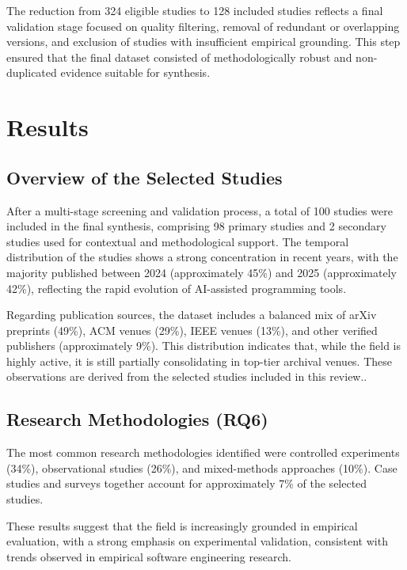 \documentclass[conference]{IEEEtran}
\begin{document}
The reduction from 324 eligible studies to 128 included studies reflects a final validation stage focused on quality filtering, removal of redundant or overlapping versions, and exclusion of studies with insufficient empirical grounding. This step ensured that the final dataset consisted of methodologically robust and non-duplicated evidence suitable for synthesis.

\section{Results}

\subsection{Overview of the Selected Studies}

After a multi-stage screening and validation process, a total of 100 studies were included in the final synthesis, comprising 98 primary studies and 2 secondary studies used for contextual and methodological support. The temporal distribution of the studies shows a strong concentration in recent years, with the majority published between 2024 (approximately 45\%) and 2025 (approximately 42\%), reflecting the rapid evolution of AI-assisted programming tools.

Regarding publication sources, the dataset includes a balanced mix of arXiv preprints (49\%), ACM venues (29\%), IEEE venues (13\%), and other verified publishers (approximately 9\%). This distribution indicates that, while the field is highly active, it is still partially consolidating in top-tier archival venues. These observations are derived from the selected studies included in this review..

\subsection{Research Methodologies (RQ6)}

The most common research methodologies identified were controlled experiments (34\%), observational studies (26\%), and mixed-methods approaches (10\%). Case studies and surveys together account for approximately 7\% of the selected studies.

These results suggest that the field is increasingly grounded in empirical evaluation, with a strong emphasis on experimental validation, consistent with trends observed in empirical software engineering research.
\end{document}
